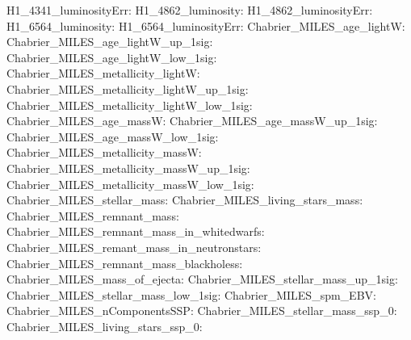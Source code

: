 H1\_4341\_luminosityErr:  \newline 
H1\_4862\_luminosity:  \newline 
H1\_4862\_luminosityErr:  \newline 
H1\_6564\_luminosity:  \newline 
H1\_6564\_luminosityErr:  \newline 
Chabrier\_MILES\_age\_lightW:  \newline 
Chabrier\_MILES\_age\_lightW\_up\_1sig:  \newline 
Chabrier\_MILES\_age\_lightW\_low\_1sig:  \newline 
Chabrier\_MILES\_metallicity\_lightW:  \newline 
Chabrier\_MILES\_metallicity\_lightW\_up\_1sig:  \newline 
Chabrier\_MILES\_metallicity\_lightW\_low\_1sig:  \newline 
Chabrier\_MILES\_age\_massW:  \newline 
Chabrier\_MILES\_age\_massW\_up\_1sig:  \newline 
Chabrier\_MILES\_age\_massW\_low\_1sig:  \newline 
Chabrier\_MILES\_metallicity\_massW:  \newline 
Chabrier\_MILES\_metallicity\_massW\_up\_1sig:  \newline 
Chabrier\_MILES\_metallicity\_massW\_low\_1sig:  \newline 
Chabrier\_MILES\_stellar\_mass:  \newline 
Chabrier\_MILES\_living\_stars\_mass:  \newline 
Chabrier\_MILES\_remnant\_mass:  \newline 
Chabrier\_MILES\_remnant\_mass\_in\_whitedwarfs:  \newline 
Chabrier\_MILES\_remant\_mass\_in\_neutronstars:  \newline 
Chabrier\_MILES\_remnant\_mass\_blackholess:  \newline 
Chabrier\_MILES\_mass\_of\_ejecta:  \newline 
Chabrier\_MILES\_stellar\_mass\_up\_1sig:  \newline 
Chabrier\_MILES\_stellar\_mass\_low\_1sig:  \newline 
Chabrier\_MILES\_spm\_EBV:  \newline 
Chabrier\_MILES\_nComponentsSSP:  \newline 
Chabrier\_MILES\_stellar\_mass\_ssp\_0:  \newline 
Chabrier\_MILES\_living\_stars\_ssp\_0:  \newline 

